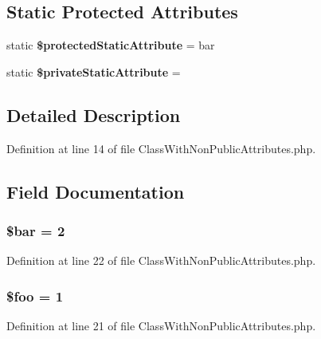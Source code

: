 \subsection*{Static Protected Attributes}
\begin{DoxyCompactItemize}
\item 
static {\bf \$protected\+Static\+Attribute} = \textquotesingle{}bar\textquotesingle{}
\item 
static {\bf \$private\+Static\+Attribute} = \textquotesingle{}
\end{DoxyCompactItemize}


\subsection{Detailed Description}


Definition at line 14 of file Class\+With\+Non\+Public\+Attributes.\+php.



\subsection{Field Documentation}
\subsubsection[{\$bar}]{\setlength{\rightskip}{0pt plus 5cm}\$bar = 2}\label{class_class_with_non_public_attributes_ab669d165b99e23bf90d68a0a057f69ac}


Definition at line 22 of file Class\+With\+Non\+Public\+Attributes.\+php.

\subsubsection[{\$foo}]{\setlength{\rightskip}{0pt plus 5cm}\${\bf foo} = 1}\label{class_class_with_non_public_attributes_a7a1efa8a0f6183fb3a5e8e8b0696526c}


Definition at line 21 of file Class\+With\+Non\+Public\+Attributes.\+php.

